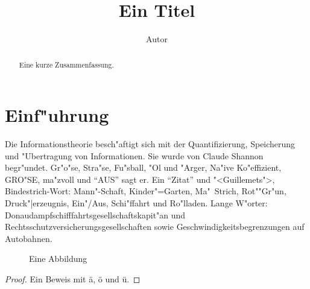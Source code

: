 \documentclass{article}
\title{Ein Titel}
\author{Autor}
\begin{document}
\maketitle
\begin{abstract}
Eine kurze Zusammenfassung.
\end{abstract}
\tableofcontents
\section{Einf"uhrung}
Die Informationstheorie besch"aftigt sich mit der Quantifizierung, Speicherung und "Ubertragung von Informationen. Sie wurde von Claude Shannon begr"undet. Gr"o"se, Stra"se, Fu"sball, "Ol und "Arger, Na"ive Ko"effizient, GRO"SE, ma"zvoll und "`AUS"' sagt er.
Ein "`Zitat"' und "<Guillemets">, Bindestrich-Wort: Mann"-Schaft, Kinder"=Garten, Ma"~Strich, Rot""Gr"un, Druck"|erzeugnis, Ein"/Aus, Schi"ffahrt und Ro"lladen.
Lange W"orter: Donaudampfschifffahrtsgesellschaftskapit"an und Rechtsschutzversicherungsgesellschaften sowie Geschwindigkeitsbegrenzungen auf Autobahnen.
\begin{figure}[h]
\caption{Eine Abbildung}
\end{figure}
\begin{table}[h]
\caption{Eine Tabelle}
\end{table}
\begin{proof}
Ein Beweis mit \"a, \"o und \"u.
\end{proof}
\end{document}
